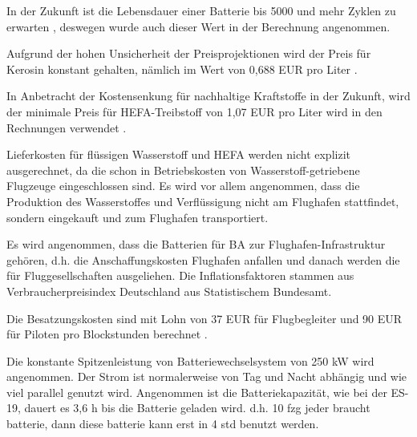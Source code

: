 In der Zukunft ist die Lebensdauer einer Batterie bis 5000 und mehr Zyklen zu erwarten \cite{reimers2018introduction}, deswegen wurde auch dieser
Wert in der Berechnung angenommen.

Aufgrund der hohen Unsicherheit der Preisprojektionen wird der Preis für Kerosin konstant gehalten, nämlich im Wert von
0,688 EUR pro Liter \cite{iata_industry_statistics_2024}. 


In Anbetracht der Kostensenkung für nachhaltige Kraftstoffe in der Zukunft, wird der minimale Preis für HEFA-Treibstoff 
von 1,07 EUR pro Liter wird in den Rechnungen verwendet \cite{watson2024sustainable}.

Lieferkosten für flüssigen Wasserstoff und HEFA werden nicht explizit ausgerechnet,
da die schon in Betriebskosten von Wasserstoff-getriebene Flugzeuge eingeschlossen sind. Es wird vor allem angenommen, dass die Produktion 
des Wasserstoffes und Verflüssigung nicht am Flughafen stattfindet, sondern eingekauft und zum Flughafen transportiert.

Es wird angenommen, dass die Batterien für BA zur Flughafen-Infrastruktur gehören, 
d.h. die Anschaffungskosten Flughafen anfallen und danach werden die für Fluggesellschaften ausgeliehen.
Die Inflationsfaktoren stammen aus Verbraucherpreisindex Deutschland aus Statistischem Bundesamt.

Die Besatzungskosten sind mit Lohn von 37 EUR für Flugbegleiter und 90 EUR für Piloten pro Blockstunden berechnet \cite{discover_airlines_cabin}.

Die konstante Spitzenleistung von Batteriewechselsystem von 250 kW wird angenommen. Der Strom ist normalerweise von Tag und Nacht abhängig
und wie viel parallel genutzt wird. Angenommen ist die Batteriekapazität, wie bei der ES-19, dauert es 3,6 h bis die Batterie geladen wird.
d.h. 10 fzg jeder braucht batterie, dann diese batterie kann erst in 4 std benutzt werden.